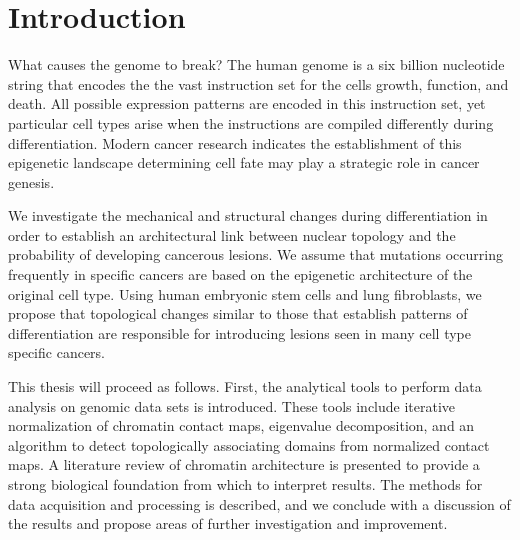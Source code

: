 
\chapter{Introduction}

What causes the genome to break?  The human genome is a six billion nucleotide string that encodes the
the vast instruction set for the cells growth, function, and death.  All possible expression patterns are
encoded in this instruction set, yet particular cell types arise when the instructions are compiled differently
during differentiation.  Modern cancer research indicates the establishment of this epigenetic landscape
determining cell fate may play a strategic role in cancer genesis.

We investigate the mechanical and structural changes during differentiation in order to establish an
architectural link between nuclear topology and the probability of developing cancerous lesions.  We
assume that mutations occurring frequently in specific cancers are based on the epigenetic architecture
of the original cell type.  Using human embryonic stem cells and lung fibroblasts, we propose that
topological changes similar to those that establish patterns of differentiation are responsible for
introducing lesions seen in many cell type specific cancers.

This thesis will proceed as follows.  First, the analytical tools to perform data analysis on genomic
data sets is introduced.  These tools include iterative normalization of chromatin contact maps, eigenvalue
decomposition, and an algorithm to detect topologically associating domains from normalized contact maps.
A literature review of chromatin architecture is presented to provide a strong biological foundation from which
to interpret results.  The methods for data acquisition and processing is described, and we conclude with a
discussion of the results and propose areas of further investigation and improvement.
